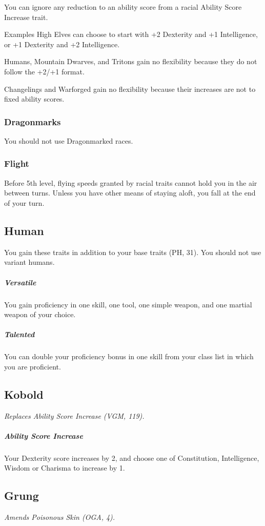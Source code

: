 \documentclass[letterpaper,twocolumn,openany,nodeprecatedcode]{dndbook}
\begin{document}
You can ignore any reduction to an ability score from a racial Ability Score Increase trait.

\begin{DndComment}{Examples}
High Elves can choose to start with +2 Dexterity and +1 Intelligence, or +1 Dexterity and +2 Intelligence. 

Humans, Mountain Dwarves, and Tritons gain no flexibility because they do not follow the +2/+1 format.

Changelings and Warforged gain no flexibility because their increases are not to fixed ability scores.
\end{DndComment}


\subsubsection{Dragonmarks} You should not use Dragonmarked races.

\subsubsection{Flight} Before 5th level, flying speeds granted by racial traits cannot hold you in the air between turns. Unless you have other means of staying aloft, you fall at the end of your turn.

\subsection{Human}
You gain these traits in addition to your base traits (PH, 31). You should not use variant humans.

\subparagraph{Versatile} You gain proficiency in one skill, one tool, one simple weapon, and one martial weapon of your choice.
\subparagraph{Talented} You can double your proficiency bonus in one skill from your class list in which you are proficient.

\subsection{Kobold}
\textit{Replaces Ability Score Increase (VGM, 119).}

\subparagraph{Ability Score Increase} Your Dexterity score increases by 2, and choose one of Constitution, Intelligence, Wisdom or Charisma to increase by 1.

\subsection{Grung}
\textit{Amends Poisonous Skin (OGA, 4).}
\end{document}
